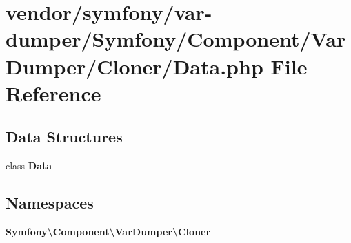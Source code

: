 \section{vendor/symfony/var-\/dumper/\+Symfony/\+Component/\+Var\+Dumper/\+Cloner/\+Data.php File Reference}
\label{_data_8php}
\subsection*{Data Structures}
\begin{DoxyCompactItemize}
\item 
class {\bf Data}
\end{DoxyCompactItemize}
\subsection*{Namespaces}
\begin{DoxyCompactItemize}
\item 
 {\bf Symfony\textbackslash{}\+Component\textbackslash{}\+Var\+Dumper\textbackslash{}\+Cloner}
\end{DoxyCompactItemize}
